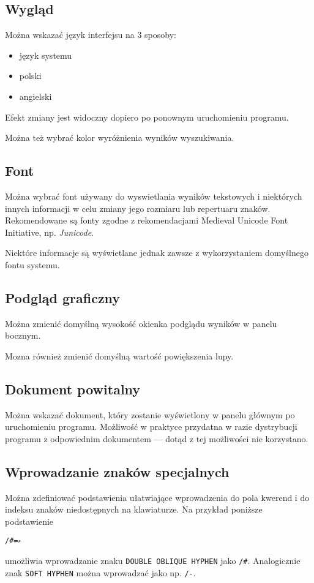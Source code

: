 \documentclass{mwart}
\begin{document}
\subsection{Wygląd}
\label{sec:wygld}

Można wskazać język interfejsu na 3 sposoby:
\begin{itemize}
\item język systemu
\item polski
\item angielski
\end{itemize}
Efekt zmiany jest widoczny dopiero po ponownym uruchomieniu programu.

Można też wybrać kolor wyróżnienia wyników wyszukiwania.

\subsection{Font}
\label{sec:font}

Można wybrać font używany do wyswietlania wyników tekstowych i
niektórych innych informacji w celu zmiany jego rozmiaru lub
repertuaru znaków. Rekomendowane są fonty zgodne z rekomendacjami
Medieval Unicode Font Initiative, np. \textsl{Junicode}.

Niektóre informacje są wyświetlane jednak zawsze z wykorzystaniem
domyślnego fontu systemu.

\subsection{Podgląd graficzny}
\label{sec:podgld-graficzny}

Można zmienić domyślną wysokość okienka podglądu wyników w panelu
bocznym.

Mozna również zmienić domyślną wartość powiększenia lupy.

\subsection{Dokument powitalny}
\label{sec:dokument-powitalny}

Można wskazać dokument, który zostanie wyświetlony w panelu głównym po
uruchomieniu programu. Możliwość w praktyce przydatna w razie
dystrybucji programu z odpowiednim dokumentem --- dotąd z tej
możliwości nie korzystano.

\subsection{Wprowadzanie znaków specjalnych}
\label{sec:wprow-znak-specj}
Można zdefiniować podstawienia ułatwiające wprowadzenia do pola
kwerend i do indeksu znaków niedostępnych na klawiaturze. Na przykład
poniższe podstawienie
\begin{verbatim}
/#=⸗
\end{verbatim}
umożliwia wprowadzanie znaku \texttt{DOUBLE OBLIQUE HYPHEN} jako
\texttt{/\#}. Analogicznie znak \texttt{SOFT HYPHEN} można wprowadzać
jako np. \texttt{/-}.
\end{document}
